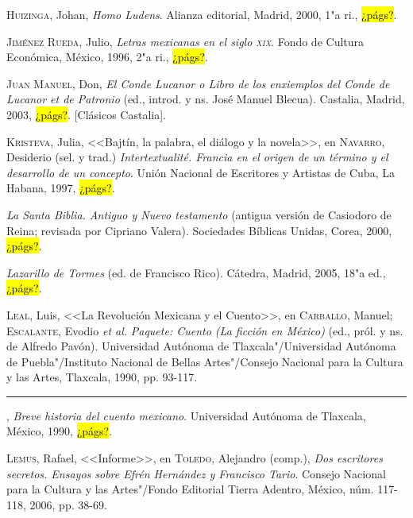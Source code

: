 \documentclass[14pt,twoside,final]{extbook} %
\begin{document}
\textsc{Huizinga}, Johan, \emph{Homo Ludens}. Alianza editorial, Madrid, 2000, 1"a ri., \hl{¿págs?}.\label{bib:huizinga2000}

\textsc{Jiménez Rueda}, Julio, \emph{Letras mexicanas en el siglo \textsc{xix}}. Fondo de Cultura Económica, México, 1996, 2"a ri., \hl{¿págs?}.\label{bib:jimenez1996}

\textsc{Juan Manuel}, Don, \emph{El Conde Lucanor o Libro de los enxiemplos del Conde de Lucanor et de Patronio} (ed., introd. y ns. José Manuel Blecua). Castalia, Madrid, 2003, \hl{¿págs?}. [Clásicos Castalia].\label{bib:juanmanuel2003}

\textsc{Kristeva}, Julia, <<Bajtín, la palabra, el diálogo y la novela>>, en \textsc{Navarro}, Desiderio (sel. y trad.) \emph{Intertextualité. Francia en el origen de un término y el desarrollo de un concepto}. Unión Nacional de Escritores y Artistas de Cuba, La Habana, 1997, \hl{¿págs?}.\label{bib:kristeva1997}

\emph{La Santa Biblia. Antiguo y Nuevo testamento} (antigua versión de Casiodoro de Reina; revisada por Cipriano Valera). Sociedades Bíblicas Unidas, Corea, 2000, \hl{¿págs?}.\label{bib:biblia2000}

\emph{Lazarillo de Tormes} (ed. de Francisco Rico). Cátedra, Madrid, 2005, 18"a ed., \hl{¿págs?}.\label{bib:lazarillo2005}

\textsc{Leal}, Luis, <<La Revolución Mexicana y el Cuento>>, en \textsc{Carballo}, Manuel; \textsc{Escalante}, Evodio \emph{et al.} \emph{Paquete: Cuento (La ficción en México)} (ed., pról. y ns. de Alfredo Pavón). Universidad Autónoma de Tlaxcala"/Universidad Autónoma de Puebla"/Instituto Nacional de Bellas Artes"/Consejo Nacional para la Cultura y las Artes, Tlaxcala, 1990, pp. 93-117.\label{bib:leal1990a}

\rule{1cm}{0.4pt}, \emph{Breve historia del cuento mexicano}. Universidad Autónoma de Tlaxcala, México, 1990, \hl{¿págs?}.\label{bib:leal1990b}

\textsc{Lemus}, Rafael, <<Informe>>, en \textsc{Toledo}, Alejandro (comp.), \emph{Dos escritores secretos. Ensayos sobre Efrén Hernández y Francisco Tario}. Consejo Nacional para la Cultura y las Artes"/Fondo Editorial Tierra Adentro, México, núm. 117-118, 2006, pp. 38-69.\label{bib:lemus2006}
\end{document}
